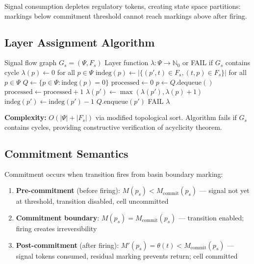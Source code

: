 \documentclass[10pt,letterpaper]{article}
\begin{document}
Signal consumption depletes regulatory tokens, creating state space partitions: markings below commitment threshold cannot reach markings above after firing.

\subsection{Layer Assignment Algorithm}

\begin{algorithm}
\caption{Hierarchical Layer Assignment}
\begin{algorithmic}[1]
\Require Signal flow graph $G_s = (\Psi, F_s)$
\Ensure Layer function $\lambda: \Psi \rightarrow \mathbb{N}_0$ or FAIL if $G_s$ contains cycle
\State $\lambda(p) \leftarrow 0$ for all $p \in \Psi$
\State $\text{indeg}(p) \leftarrow |\{(p',t) \in F_s, (t,p) \in F_s\}|$ for all $p \in \Psi$ 
\State $Q \leftarrow \{p \in \Psi : \text{indeg}(p) = 0\}$ 
\State $\text{processed} \leftarrow 0$
    \State $p \leftarrow Q.\text{dequeue}()$
    \State $\text{processed} \leftarrow \text{processed} + 1$
     
        \State $\lambda(p') \leftarrow \max(\lambda(p'), \lambda(p) + 1)$
        \State $\text{indeg}(p') \leftarrow \text{indeg}(p') - 1$
            \State $Q.\text{enqueue}(p')$
        \EndIf
    \EndFor
\EndWhile
{}
    \State \Return FAIL 
\Else
    \State \Return $\lambda$
\EndIf
\end{algorithmic}
\end{algorithm}

\textbf{Complexity:} $O(|\Psi| + |F_s|)$ via modified topological sort. Algorithm fails if $G_s$ contains cycles, providing constructive verification of acyclicity theorem.

\subsection{Commitment Semantics}
\label{sec:commitment_semantics}

Commitment occurs when transition fires from basin boundary marking:
\begin{enumerate}
\item \textbf{Pre-commitment} (before firing): $M(p_s) < M_{\text{commit}}(p_s)$ --- signal not yet at threshold, transition disabled, cell uncommitted
\item \textbf{Commitment boundary}: $M(p_s) = M_{\text{commit}}(p_s)$ --- transition enabled; firing creates irreversibility
\item \textbf{Post-commitment} (after firing): $M'(p_s) = \theta(t) < M_{\text{commit}}(p_s)$ --- signal tokens consumed, residual marking prevents return; cell committed
\end{enumerate}
\end{document}
